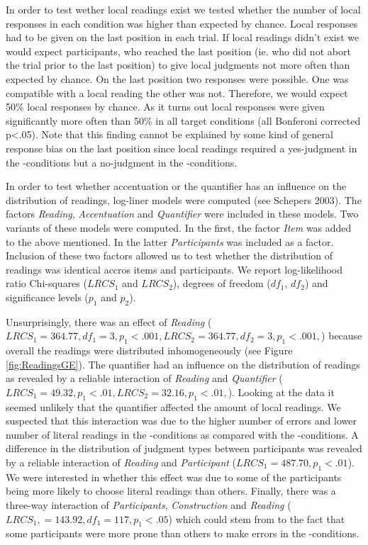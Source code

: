 \documentclass[fleqn,reqno,10pt,draft]{article}
\newcommand{\as}{\acro{as}}
\renewcommand{\es}{\acro{es}}
\begin{document}
In order to test wether local readings exist we tested whether the
number of local responses in each condition was higher than expected
by chance. Local responses had to be given on the last position in
each trial. If local readings didn't exist we would expect
participants, who reached the last position (ie. who did not abort the
trial prior to the last position) to give local judgments not more
often than expected by chance. On the last position two responses were
possible. One was compatible with a local reading the other was
not. Therefore, we would expect 50\% local responses by chance. As it
turns out local responses were given significantly more often than
50\% in all target conditions (all Bonferoni corrected p<.05). Note
that this finding cannot be explained by some kind of general response
bias on the last position since local readings required a yes-judgment
in the \es-conditions but a no-judgment in the \as-conditions.

In order to test whether accentuation or the quantifier has an
influence on the distribution of readings, log-liner models were
computed (see Schepers 2003). The factors {\it Reading}, {\it
  Accentuation} and {\it Quantifier} were included in these
models. Two variants of these models were computed.  In the first, the
factor {\it Item} was added to the above mentioned. In the latter {\it
  Participants} was included as a factor. Inclusion of these two
factors allowed us to test whether the distribution of readings was
identical accros items and participants. We report log-likelihood
ratio Chi-squares ($LRCS_1$ and $LRCS_2$), degrees of freedom ($df_1$,
$df_2$) and significance levels ($p_1$ and $p_2$).

Unsurprisingly, there was an effect of \emph{Reading} ($LRCS_1=364.77,
df_1 = 3, p_1<.001, LRCS_2=364.77, df_2 = 3, p_1<.001,$) because
overall the readings were distributed inhomogeneously (see Figure
\ref{fig:ReadingsGE}). The quantifier had an influence on the
distribution of readings as revealed by a reliable interaction of {\it
  Reading} and {\it Quantifier} ($LRCS_1=49.32, p_1<.01,LRCS_2=32.16,
p_1<.01,$). Looking at the data it seemed unlikely that the quantifier
affected the amount of local readings. We suspected that this
interaction was due to the higher number of errors and lower number of
literal readings in the \es-conditions as compared with the
\as-conditions. A difference in the distribution of judgment types
between participants was revealed by a reliable interaction of {\it
  Reading} and {\it Participant} ($LRCS_1=487.70, p_1<.01$). We were
interested in whether this effect was due to some of the participants
being more likely to choose literal readings than others. Finally,
there was a three-way interaction of {\it Participants}, {\it
  Construction} and {\it Reading} ($LRCS_1, = 143.92, df_1 = 117,
p_1<.05$) which could stem from to the fact that some participants
were more prone than others to make errors in the \es-conditions.
\end{document}
